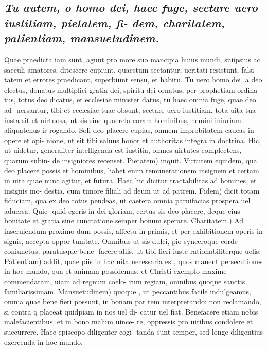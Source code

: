 \documentclass{article}
\begin{document}
\begin{pages}
\subsection*{\textit{Tu autem, o homo dei, haec fuge, sectare uero iustitiam, pietatem, fi- dem, charitatem, patientiam, mansuetudinem. }}\pstart Quae praedicta iam sunt, agunt pro more suo mancipia huius mundi, suiipsius ac saeculi amatores, ditescere cupiunt, quaestum sectantur, ueritati resistunt, falsi- tatem et errores praedicant, superbiunt sensu, et habitu. Tu uero homo dei, a deo electus, donatus multiplici gratia dei, spiritu dei ornatus, per prophetiam ordina tus, totus deo dicatus, et ecclesiae minister datus, tu haec omnia fuge, quae deo ad- uersantur, tibi et ecclesiae tuae obsunt, sectare uero iustitiam, tota uita tua iusta sit et uirtuosa, ut sis sine quaerela coram hominibus, nemini iniuriam aliquatenus ir rogando. Soli deo placere cupias, omnem improbitatem caueas in opere et opi- nione, ut sit tibi saluus honor et authoritas integra in doctrina. Hic, ut uidetur, generaliter intelligenda est iustitia, omnes uirtutes complectens, quarum subin- de insigniores recenset. Pietatem) inquit. Virtutem equidem, qua deo placere possis et hominibus, habet enim remunerationem insignem et certam in uita quae nunc agitur, et futura. Haec hic dicitur tractabilitas ad homines, et insignis mo- destia, cum timore filiali ad deum ut ad patrem. Fidem) dicit totam fiduciam, qua ex deo totus pendeas, ut caetera omnia paruifacias prospera uel aduersa. Quic- quid egeris in dei gloriam, certus sis deo placere, deque eius bonitate et gratia sine cunctatione semper bonum sperare. Charitatem.) Ad inseruiendum proximo dum possis, affectu in primis, et per exhibitionem operis in signis, accepta oppor tunitate. Omnibus ut sis dulci, pio synceroque corde coniunctus, paratusque bene- facere aliis, ut tibi fieri iuste rationabiliterque uelis. Patientiam) addit, quae piis in hac uita necessaria est, quos manent persecutiones in hoc mundo, qua et animam possidemus, et Christi exemplo maxime commendatam, uiam ad regnum coelo- rum regiam, omnibus quoque sanctis familiarissimam. Mansuetudinem) quoque , ut peccantibus facile indulgeamus, omnia quae bene fieri possunt, in bonam par tem interpretando: non reclamando, si contra q placeat quidpiam in nos uel di- catur uel fiat. Benefacere etiam nobis malefacientibus, et in bono malum uince- re, oppressis pro uiribus condolere et succurrere. Haec episcopo diligenter cogi- tanda sunt semper, sed longe diligentius exercenda in hoc mundo.  \pend
{}
{}

\end{pages}
\end{document}
